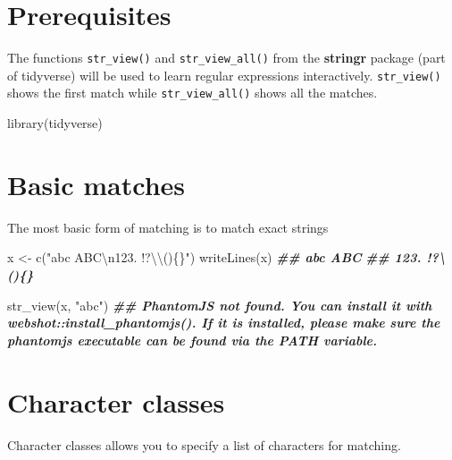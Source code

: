 \documentclass[
]{book}
\newenvironment{Shaded}{\begin{snugshade}}{\end{snugshade}}
\newcommand{\DocumentationTok}[1]{\textcolor[rgb]{0.56,0.35,0.01}{\textbf{\textit{#1}}}}
\newcommand{\FunctionTok}[1]{\textcolor[rgb]{0.00,0.00,0.00}{#1}}
\newcommand{\NormalTok}[1]{#1}
\newcommand{\OtherTok}[1]{\textcolor[rgb]{0.56,0.35,0.01}{#1}}
\newcommand{\SpecialCharTok}[1]{\textcolor[rgb]{0.00,0.00,0.00}{#1}}
\newcommand{\StringTok}[1]{\textcolor[rgb]{0.31,0.60,0.02}{#1}}
\begin{document}
\hypertarget{prerequisites-4}{%
\section{Prerequisites}\label{prerequisites-4}}

The functions \texttt{str\_view()} and \texttt{str\_view\_all()} from the \textbf{stringr} package (part of tidyverse) will be used to learn regular expressions interactively. \texttt{str\_view()} shows the first match while \texttt{str\_view\_all()} shows all the matches.

\begin{Shaded}
\begin{Highlighting}[]
\FunctionTok{library}\NormalTok{(tidyverse)}
\end{Highlighting}
\end{Shaded}

\hypertarget{basic-matches}{%
\section{Basic matches}\label{basic-matches}}

The most basic form of matching is to match exact strings

\begin{Shaded}
\begin{Highlighting}[]
\NormalTok{x }\OtherTok{\textless{}{-}} \FunctionTok{c}\NormalTok{(}\StringTok{"abc ABC}\SpecialCharTok{\textbackslash{}n}\StringTok{123. !?}\SpecialCharTok{\textbackslash{}\textbackslash{}}\StringTok{()\{\}"}\NormalTok{)}
\FunctionTok{writeLines}\NormalTok{(x)}
\DocumentationTok{\#\# abc ABC}
\DocumentationTok{\#\# 123. !?\textbackslash{}()\{\}}

\FunctionTok{str\_view}\NormalTok{(x, }\StringTok{"abc"}\NormalTok{)}
\DocumentationTok{\#\# PhantomJS not found. You can install it with webshot::install\_phantomjs(). If it is installed, please make sure the phantomjs executable can be found via the PATH variable.}
\end{Highlighting}
\end{Shaded}

\hypertarget{character-classes}{%
\section{Character classes}\label{character-classes}}

Character classes allows you to specify a list of characters for matching.
\end{document}
